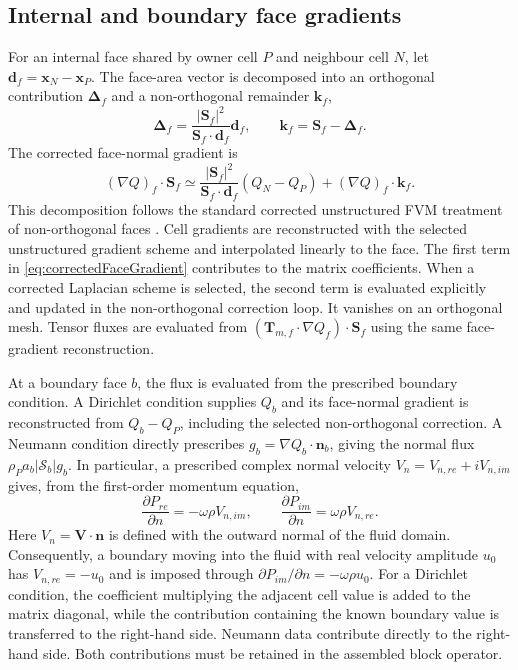 \documentclass[final,12pt,nopreprintline,longtitle]{elsarticle}
\newcommand{\V}{\mathbf{V}}
\newcommand{\x}{\mathbf{x}}
\newcommand{\Sf}{\mathbf{S}_f}
\begin{document}
\subsection{Internal and boundary face gradients}

For an internal face shared by owner cell $P$ and neighbour cell $N$, let
$\mathbf{d}_f=\x_N-\x_P$.  The face-area vector is decomposed into an
orthogonal contribution $\boldsymbol{\Delta}_f$ and a non-orthogonal remainder
$\mathbf{k}_f$,
\begin{equation}
    \boldsymbol{\Delta}_f
    =\frac{|\Sf|^2}{\Sf\cdot\mathbf{d}_f}\mathbf{d}_f,
    \qquad
    \mathbf{k}_f=\Sf-\boldsymbol{\Delta}_f.
    \label{eq:faceAreaDecomposition}
\end{equation}
The corrected face-normal gradient is
\begin{equation}
    (\nabla Q)_f\cdot\Sf
    \simeq
    \frac{|\Sf|^2}{\Sf\cdot\mathbf{d}_f}(Q_N-Q_P)
    +(\nabla Q)_f\cdot\mathbf{k}_f.
    \label{eq:correctedFaceGradient}
\end{equation}
This decomposition follows the standard corrected unstructured FVM treatment
of non-orthogonal faces \cite{Jasak1996,Moukalled2016}.
Cell gradients are reconstructed with the selected unstructured gradient
scheme and interpolated linearly to the face.  The first term in
\cref{eq:correctedFaceGradient} contributes to the matrix coefficients.  When
a corrected Laplacian scheme is selected, the second term is evaluated
explicitly and updated in the non-orthogonal correction loop.  It vanishes on
an orthogonal mesh.  Tensor fluxes are evaluated from
$(\mathbf{T}_{m,f}\cdot\nabla Q_f)\cdot\Sf$ using the same face-gradient
reconstruction.

At a boundary face $b$, the flux is evaluated from the prescribed boundary
condition.  A Dirichlet condition supplies $Q_b$ and its face-normal gradient
is reconstructed from $Q_b-Q_P$, including the selected non-orthogonal
correction.  A Neumann condition directly prescribes
$g_b=\nabla Q_b\cdot\mathbf{n}_b$, giving the normal flux
$\rho_Pa_b|\mathcal{S}_b|g_b$.  In particular, a prescribed complex normal
velocity $V_n=V_{n,re}+iV_{n,im}$ gives, from the first-order momentum equation,
\begin{equation}
    \frac{\partial P_{re}}{\partial n}
    =-\omega\rho V_{n,im},
    \qquad
    \frac{\partial P_{im}}{\partial n}
    =\omega\rho V_{n,re}.
    \label{eq:velocityPressureBoundary}
\end{equation}
Here $V_n=\V\cdot\mathbf{n}$ is defined with the outward normal of the fluid
domain.  Consequently, a boundary moving into the fluid with real velocity
amplitude $u_0$ has $V_{n,re}=-u_0$ and is imposed through
$\partial P_{im}/\partial n=-\omega\rho u_0$.
For a Dirichlet condition, the coefficient multiplying the adjacent cell value
is added to the matrix diagonal, while the contribution containing the known
boundary value is transferred to the right-hand side.  Neumann data contribute
directly to the right-hand side.
Both contributions must be retained in the assembled block operator.
\end{document}
